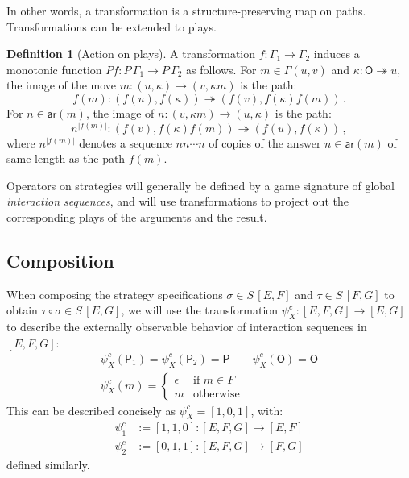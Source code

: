 \documentclass[11pt,oneside,draft]{book}
\theoremstyle{definition}
\newtheorem{definition}[theorem]{Definition}
\newcommand{\kw}[1]{\ensuremath{ \mathsf{#1} }}
\begin{document}
In other words,
a transformation
is a structure-preserving map on paths.
Transformations can be extended to plays.

\begin{definition}[Action on plays]
A transformation
$f : \Gamma_1 \rightarrow \Gamma_2$
induces a monotonic function
$P f  : P \, \Gamma_1 \rightarrow P \, \Gamma_2$
as follows.
For $m \in \Gamma(u, v)$ and $\kappa : \kw{O} \twoheadrightarrow u$,
the image of the move
$m : (u, \kappa) \rightarrow (v, \kappa m)$
is the path:
\[
 f(m) : (f(u), f(\kappa)) \twoheadrightarrow
        (f(v), f(\kappa) f(m)) \,.
\]
For $n \in \kw{ar}(m)$,
the image of
$n : (v, \kappa m) \rightarrow (u, \kappa)$
is the path:
\[
 n^{|f(m)|} : (f(v), f(\kappa) f(m)) \twoheadrightarrow
              (f(u), f(\kappa)) \,,
\]
where $n^{|f(m)|}$ denotes a sequence $nn \cdots n$
of copies of the answer $n \in \kw{ar}(m)$
of same length as the path $f(m)$.
\end{definition}

Operators on strategies will generally be defined
by a game signature of global \emph{interaction sequences},
and will use transformations to project out
the corresponding plays of the arguments and the result.

\subsection{Composition} %

When composing the strategy specifications
$\sigma \in S \, [E, F]$ and
$\tau \in S \, [F, G]$
to obtain $\tau \circ \sigma \in S \, [E, G]$,
we will use the transformation
$\psi^c_X : [E,F,G] \rightarrow [E,G]$
to describe the externally observable behavior
of interaction sequences in $[E,F,G]$:
\begin{gather*}
  \psi^c_X(\kw{P}_1) = \psi^c_X(\kw{P}_2) = \kw{P} \qquad
  \psi^c_X(\kw{O}) = \kw{O}
  \\
  \psi^c_X(m) = \begin{cases}
    \epsilon & \text{if } m \in F \\
    m & \text{otherwise}
  \end{cases}
\end{gather*}
This can be described concisely as
$\psi^c_X = [1,0,1]$,
with:
\begin{align*}
  \psi^c_1 &:= [1,1,0] :
    [E,F,G] \rightarrow [E,F] \\
  \psi^c_2 &:= [0,1,1] :
     [E,F,G] \rightarrow [F,G]
\end{align*}
defined similarly.
\end{document}
